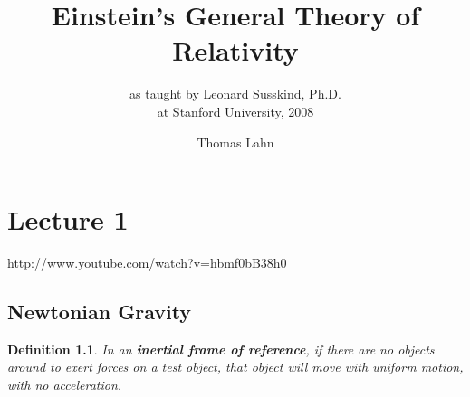 \documentclass[pagesize,headsepline,10pt,parskip=half,BCOR=12mm]{scrreprt}
\newtheorem{mydef}{Definition}
\begin{document}

  \begin{titlepage}
    \title{Einstein's General Theory of Relativity}
    \subtitle{as taught by Leonard\xspace Susskind,
    Ph.D.\xspace \\
      at Stanford University, 2008}
    \author{Thomas Lahn}
    \maketitle
  \end{titlepage}

  \clearpage
  \begin{spacing}{1}
    \tableofcontents
    \thispagestyle{empty}
  \end{spacing}


  \clearpage
  \chapter{Lecture 1}\label{chapter:introduction}
    \url{http://www.youtube.com/watch?v=hbmf0bB38h0}
    \section{Newtonian Gravity}
      \begin{mydef}
      In an \textbf{inertial frame of reference}, if there are no
      objects around to exert forces on a test object, that object
      will move with uniform motion, with no acceleration.
      \end{mydef}
\end{document}
